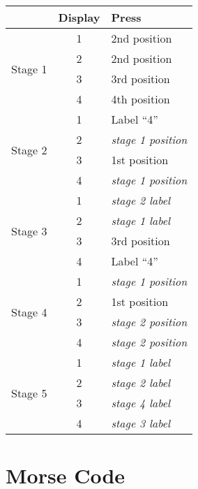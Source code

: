 \documentclass[11pt]{amsart}
\begin{document}
\begin{tabular}{|l|c|l|}
\hline
 & Display & Press \\
\hline
\multirow{4}{*}{Stage 1} & 1 & 2nd position \\
                         & 2 & 2nd position \\
                         & 3 & 3rd position \\
                         & 4 & 4th position \\
\hline
\multirow{4}{*}{Stage 2} & 1 & Label ``4'' \\
                         & 2 & \textit{stage 1 position} \\
                         & 3 & 1st position \\
                         & 4 & \textit{stage 1 position} \\
\hline
\multirow{4}{*}{Stage 3} & 1 & \textit{stage 2 label} \\
                         & 2 & \textit{stage 1 label} \\
                         & 3 & 3rd position \\
                         & 4 & Label ``4'' \\
\hline
\multirow{4}{*}{Stage 4} & 1 & \textit{stage 1 position} \\
                         & 2 & 1st position \\
                         & 3 & \textit{stage 2 position} \\
                         & 4 & \textit{stage 2 position} \\
\hline
\multirow{4}{*}{Stage 5} & 1 & \textit{stage 1 label} \\
                         & 2 & \textit{stage 2 label} \\
                         & 3 & \textit{stage 4 label} \\
                         & 4 & \textit{stage 3 label} \\
\hline
\end{tabular}



\section{Morse Code}
\end{document}
